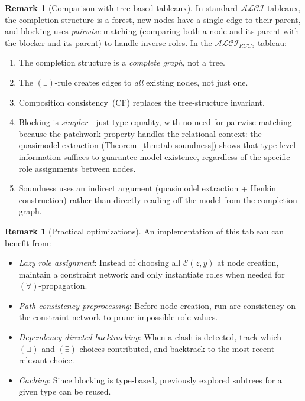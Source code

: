 \documentclass[a4paper,11pt]{article}
\theoremstyle{definition}
\newtheorem{remark}[theorem]{Remark}
\newcommand{\ALCI}{\ensuremath{\mathcal{ALCI}}}
\newcommand{\ALCIRCC}[1]{\ensuremath{\mathcal{ALCI}_{\mathit{RCC#1}}}}
\begin{document}
\begin{remark}[Comparison with tree-based tableaux]
\label{rem:comparison}
In standard $\ALCI$ tableaux, the completion structure is a forest,
new nodes have a single edge to their parent, and blocking uses
\emph{pairwise} matching (comparing both a node and its parent with
the blocker and its parent) to handle inverse roles.  In the
$\ALCIRCC{5}$ tableau:
\begin{enumerate}[nosep]
  \item The completion structure is a \emph{complete graph}, not a
    tree.
  \item The $(\exists)$-rule creates edges to \emph{all} existing
    nodes, not just one.
  \item Composition consistency~(CF) replaces the tree-structure
    invariant.
  \item Blocking is \emph{simpler}---just type equality, with no
    need for pairwise matching---because the patchwork property handles
    the relational context: the quasimodel extraction
    (Theorem~\ref{thm:tab-soundness}) shows that type-level
    information suffices to guarantee model existence, regardless of
    the specific role assignments between nodes.
  \item Soundness uses an indirect argument (quasimodel extraction +
    Henkin construction) rather than directly reading off the model
    from the completion graph.
\end{enumerate}
\end{remark}

\begin{remark}[Practical optimizations]
An implementation of this tableau can benefit from:
\begin{itemize}[nosep]
  \item \emph{Lazy role assignment}: Instead of choosing all
    $\mathcal{E}(z,y)$ at node creation, maintain a constraint network
    and only instantiate roles when needed for $(\forall)$-propagation.
  \item \emph{Path consistency preprocessing}: Before node creation,
    run arc consistency on the constraint network to prune impossible
    role values.
  \item \emph{Dependency-directed backtracking}: When a clash is
    detected, track which $(\sqcup)$ and $(\exists)$-choices
    contributed, and backtrack to the most recent relevant choice.
  \item \emph{Caching}: Since blocking is type-based, previously
    explored subtrees for a given type can be reused.
\end{itemize}
\end{remark}
\end{document}
